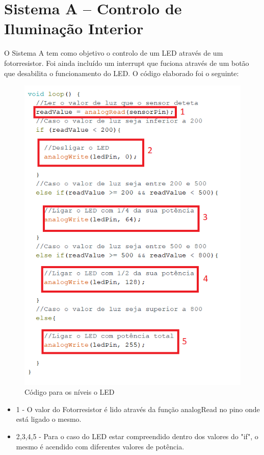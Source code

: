 \section{Sistema A – Controlo de Iluminação Interior}

O Sistema A tem como objetivo o controlo de um LED através de um fotorresistor. Foi ainda incluído um interrupt que fuciona através de um botão que desabilita o funcionamento do LED. O código elaborado foi o seguinte:

\begin{figure}[H]
    \centering
    \includegraphics[scale=0.5]{images/codigo/sisA_ledvalues.png}
    \caption{Código para os níveis o LED}
\end{figure}


\begin{itemize}
    \item 1 - O valor do Fotorresistor é lido através da função analogRead no pino onde está ligado o mesmo.
    \item 2,3,4,5 - Para o caso do LED estar compreendido dentro dos valores do "if", o mesmo é acendido com diferentes valores de potência. 
\end{itemize}

